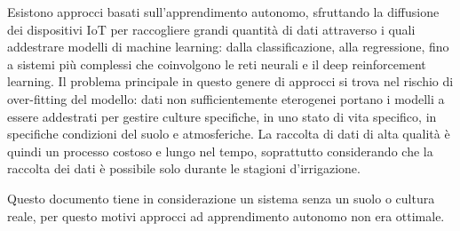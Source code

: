 \documentclass[12pt,a4paper,openright,twoside]{book}
\begin{document}
Esistono approcci basati sull'apprendimento autonomo, sfruttando la diffusione dei dispositivi IoT per raccogliere grandi quantità di dati attraverso i quali addestrare modelli di machine learning: dalla classificazione, alla regressione, fino a sistemi più complessi che coinvolgono le reti neurali e il deep reinforcement learning.
Il problema principale in questo genere di approcci si trova nel rischio di over-fitting del modello: dati non sufficientemente eterogenei portano i modelli a essere addestrati per gestire culture specifiche, in uno stato di vita specifico, in specifiche condizioni del suolo e atmosferiche.
La raccolta di dati di alta qualità è quindi un processo costoso e lungo nel tempo, soprattutto considerando che la raccolta dei dati è possibile solo durante le stagioni d'irrigazione.


Questo documento tiene in considerazione un sistema senza un suolo o cultura reale, per questo motivi approcci ad apprendimento autonomo non era ottimale.






\end{document}
